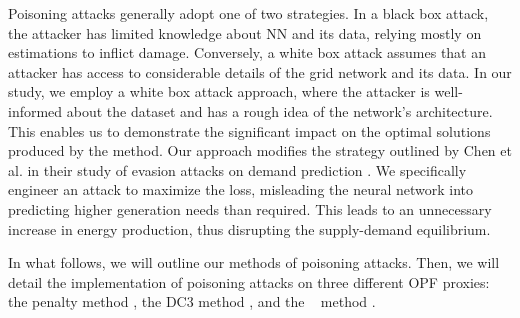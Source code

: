 
Poisoning attacks generally adopt one of two strategies. In a black box attack, the attacker has limited knowledge about NN and its data, relying mostly on estimations to inflict damage. Conversely, a white box attack assumes that an attacker has access to considerable details of the grid network and its data. In our study, we employ a white box attack approach, where the attacker is well-informed about the dataset and has a rough idea of the network's architecture. This enables us to demonstrate the significant impact on the optimal solutions produced by the method. Our approach modifies the strategy outlined by Chen et al. in their study of evasion attacks on demand prediction \cite{evasion2019demand}. We specifically engineer an attack to maximize the loss, misleading the neural network into predicting higher generation needs than required. This leads to an unnecessary increase in energy production, thus disrupting the supply-demand equilibrium.

In what follows, we will outline our methods of poisoning attacks.
Then, we will detail the implementation of poisoning attacks on three different OPF proxies: the penalty method \cite{Liu2022Pen}, the DC3 method \cite{Li_2023}, and the \LOOPLC~ method \cite{donti2021dc3}.






